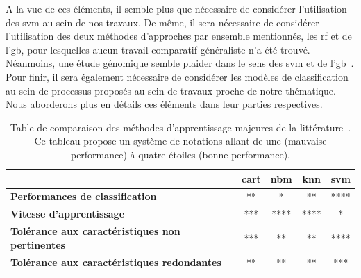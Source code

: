 A la vue de ces éléments, il semble plus que nécessaire de considérer l'utilisation des \gls{svm} au sein de nos travaux. De même, il sera nécessaire de considérer l'utilisation des deux méthodes d'approches par ensemble mentionnés, les \gls{rf} et de l'\gls{gb}, pour lesquelles aucun travail comparatif généraliste n'a été trouvé. Néanmoins, une étude génomique semble plaider dans le sens des \gls{svm} et de l'\gls{gb}~\cite{Ogutu2011}. Pour finir, il sera également nécessaire de considérer les modèles de classification au sein de processus proposés au sein de travaux proche de notre thématique. Nous aborderons plus en détails ces éléments dans leur parties respectives.\par

\begin{table}[H]
  \small
  \centering 
    \begin{tabular}{lcccc}
        \toprule
                                                                    & \textbf{\gls{cart}}   & \textbf{\gls{nbm}}& \textbf{\gls{knn}}    & \textbf{\gls{svm}}\\
        \midrule
        \textbf{Performances de classification}                     & **                    & *                 & **                    & ****              \\
        \midrule
        \textbf{Vitesse d'apprentissage}                            & ***                   & ****              & ****                  & *                 \\
        \midrule
        \textbf{Tolérance aux caractéristiques non pertinentes}     & ***                   & **                & **                    & ****              \\
        \midrule
        \textbf{Tolérance aux caractéristiques redondantes}         & **                    & **                & **                    & ***               \\
        \bottomrule
  \end{tabular}
  \caption{Table de comparaison des méthodes d'apprentissage majeures de la littérature~\cite{Kotsiantis2007}. Ce tableau propose un système de notations allant de une (mauvaise performance) à quatre étoiles (bonne performance).}
  \label{tab:model_comparison}
\end{table}
\clearpage

